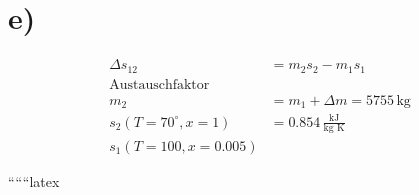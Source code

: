 

\section*{e)}

\begin{align*}
    \Delta s_{12} &= m_2 s_2 - m_1 s_1 \\
    \text{Austauschfaktor} \\
    m_2 &= m_1 + \Delta m = 5755 \, \text{kg} \\
    s_2 (T = 70^\circ, x = 1) &= 0.854 \, \frac{\text{kJ}}{\text{kg K}} \\
    s_1 (T = 100, x = 0.005)
\end{align*}

``````latex